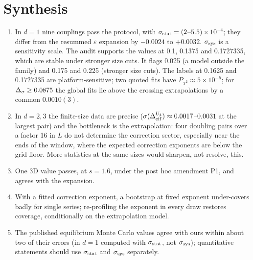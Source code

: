 \clearpage
\section{Synthesis}\label{mc:sec:synthesis}
\begin{enumerate}[1.]
\item In $d=1$ nine couplings pass the protocol, with $\sigma_{\rm stat}=(2$--$5.5)\times10^{-4}$; they differ from the resummed $\varepsilon$ expansion
 by $-0.0024$ to $+0.0032$. $\sigma_{\rm sys}$ is a sensitivity scale. The audit supports the values at 0.1, 0.1375 and 0.1727335, which are stable under
 stronger size cuts. It flags 0.025 (a model outside the family) and 0.175 and 0.225 (stronger size cuts). The labels at 0.1625 and 0.1727335
 are platform-sensitive; two quoted fits have $P_{\chi^2}\approx5\times10^{-5}$; for $\Delta_\sigma\ge0.0875$ the
 global fits lie above the crossing extrapolations by a common $0.0010(3)$.
\item In $d=2,3$ the finite-size data are precise ($\sigma(\Delta_{\rm eff}^{U_4})\approx0.0017$--$0.0031$ at the largest pair) and the bottleneck is the
 extrapolation: four doubling pairs over a factor 16 in $L$ do not determine the correction sector, especially near the ends of the window,
 where the expected correction exponents are below the grid floor. More statistics at the same sizes would sharpen, not resolve, this.
\item One 3D value passes, at $s=1.6$, under the post hoc amendment P1, and agrees with the expansion.
\item With a fitted correction exponent, a bootstrap at fixed exponent under-covers badly for single series; re-profiling the exponent in every
 draw restores coverage, conditionally on the extrapolation model.
\item The published equilibrium Monte Carlo values agree with ours within about two of their errors (in $d=1$ computed with $\sigma_{\rm stat}$, not
 $\sigma_{\rm sys}$); quantitative statements should use $\sigma_{\rm stat}$ and $\sigma_{\rm sys}$ separately.
\end{enumerate}

